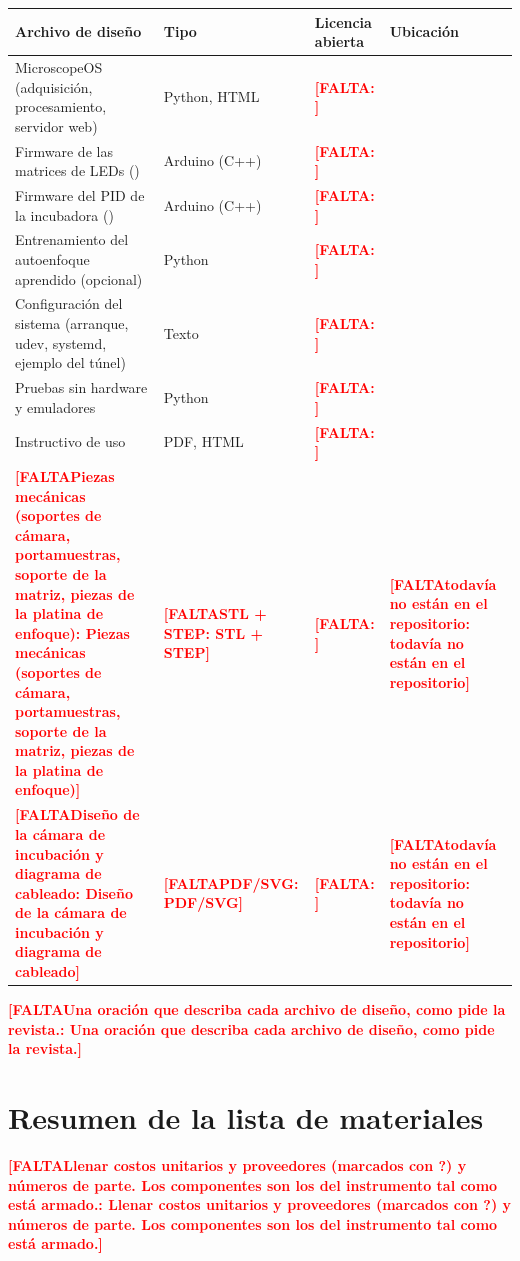 \documentclass[preprint,12pt]{elsarticle}
\DeclareRobustCommand{\TODO}[1]{\textcolor{red}{\textbf{[FALTA\ifx\relax#1\relax\else: #1\fi]}}}
\begin{document}
\noindent
\begin{tabularx}{\textwidth}{>{\raggedright\arraybackslash}p{}
  >{\raggedright\arraybackslash}p{}
  >{\raggedright\arraybackslash}p{}L}
\toprule
Archivo de diseño & Tipo & Licencia abierta & Ubicación \\
\midrule
MicroscopeOS (adquisición, procesamiento, servidor web) & Python, HTML &
  \TODO{} &  \\
Firmware de las matrices de LEDs () & Arduino (C++)
  & \TODO{} &  \\
Firmware del PID de la incubadora
  () & Arduino (C++) & \TODO{} &
   \\
Entrenamiento del autoenfoque aprendido (opcional) & Python & \TODO{} &
   \\
Configuración del sistema (arranque, udev, systemd, ejemplo del túnel) &
  Texto & \TODO{} &  \\
Pruebas sin hardware y emuladores & Python & \TODO{} &  \\
Instructivo de uso & PDF, HTML & \TODO{} &  \\
\TODO{Piezas mecánicas (soportes de cámara, portamuestras, soporte de la
  matriz, piezas de la platina de enfoque)} & \TODO{STL + STEP} & \TODO{}
  & \TODO{todavía no están en el repositorio} \\
\TODO{Diseño de la cámara de incubación y diagrama de cableado} &
  \TODO{PDF/SVG} & \TODO{} & \TODO{todavía no están en el repositorio} \\
\bottomrule
\end{tabularx}

\medskip\noindent
\TODO{Una oración que describa cada archivo de diseño, como pide la
revista.}

\section{Resumen de la lista de materiales}

\noindent\TODO{Llenar costos unitarios y proveedores (marcados con ?) y
números de parte. Los componentes son los del instrumento tal como está
armado.}
\medskip
\end{document}
